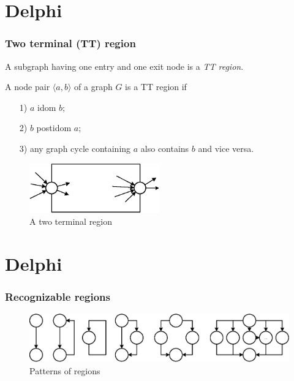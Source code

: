 \documentclass{beamer}
\begin{document}

\section{Delphi}
\begin{frame}
\frametitle{Two terminal (TT) region}

\newtheorem{TT}{Definition}[section]
\begin{Def}
A subgraph having one entry and one exit node is a \emph{TT region}.

A node pair $\langle a, b\rangle$ of a graph $G$ is a TT region if
	\begin{enumerate}
		\item[1)]
			$a$ idom $b$;
		\item[2)]
			$b$ postidom $a$;
		\item[3)]
			any graph cycle containing $a$ also contains $b$ and vice versa.
	\end{enumerate}
\end{Def}


\begin{figure}[htbp]
	\centering
		\includegraphics[width=0.5\textwidth]{Pic/TTRegion.eps}
	\caption{A two terminal region}
	\label{fig:TTRegion}
\end{figure}

\end{frame}


\section{Delphi}
\begin{frame}
\frametitle{Recognizable regions}
\begin{figure}[htbp]
	\centering
		\includegraphics[width=1\textwidth]{Pic/Reg.eps}
	\caption{Patterns of regions}
	\label{fig:Regions}
\end{figure}
\end{frame}
\end{document}
